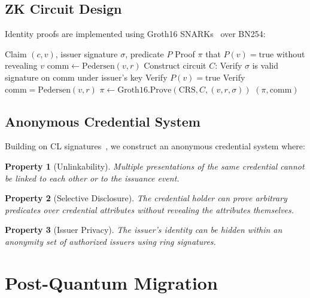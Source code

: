 \documentclass[11pt,a4paper]{article}
\newtheorem{property}{Property}
\begin{document}
\subsection{ZK Circuit Design}

Identity proofs are implemented using Groth16 SNARKs~\cite{groth2016size} over BN254:

\begin{algorithm}[H]
\caption{ZK Identity Proof Generation}
\label{alg:zkid}
\begin{algorithmic}[1]
\Require Claim $(c, v)$, issuer signature $\sigma$, predicate $P$
\Ensure Proof $\pi$ that $P(v) = \text{true}$ without revealing $v$
\State $\text{comm} \gets \text{Pedersen}(v, r)$ 
\State Construct circuit $C$:
\State \quad Verify $\sigma$ is valid signature on $\text{comm}$ under issuer's key
\State \quad Verify $P(v) = \text{true}$
\State \quad Verify $\text{comm} = \text{Pedersen}(v, r)$
\State $\pi \gets \text{Groth16.Prove}(\text{CRS}, C, (v, r, \sigma))$
\State \Return $(\pi, \text{comm})$
\end{algorithmic}
\end{algorithm}

\subsection{Anonymous Credential System}

Building on CL signatures~\cite{camenisch2001efficient}, we construct an anonymous credential system where:

\begin{property}[Unlinkability]
Multiple presentations of the same credential cannot be linked to each other or to the issuance event.
\end{property}

\begin{property}[Selective Disclosure]
The credential holder can prove arbitrary predicates over credential attributes without revealing the attributes themselves.
\end{property}

\begin{property}[Issuer Privacy]
The issuer's identity can be hidden within an anonymity set of authorized issuers using ring signatures.
\end{property}

\section{Post-Quantum Migration}
\label{sec:postquantum}
\end{document}

